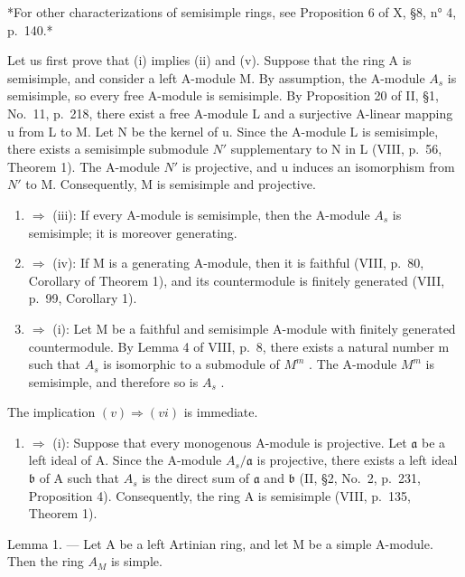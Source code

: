 *For other characterizations of semisimple rings, see Proposition 6 of X, §8, n° 4, p.~140.*

Let us first prove that (i) implies (ii) and (v). Suppose that the ring A is semisimple, and consider a left A-module M. By assumption, the A-module \(A_{s}\) is semisimple, so every free A-module is semisimple. By Proposition 20 of II, §1, No.~11, p.~218, there exist a free A-module L and a surjective A-linear mapping u from L to M. Let N be the kernel of u. Since the A-module L is semisimple, there exists a semisimple submodule \(N'\) supplementary to N in L (VIII, p.~56, Theorem 1). The A-module \(N'\) is projective, and u induces an isomorphism from \(N'\) to M. Consequently, M is semisimple and projective.

\begin{enumerate}
\def\labelenumi{(\roman{enumi})}
\setcounter{enumi}{1}
\item
  \(\Rightarrow\) (iii): If every A-module is semisimple, then the A-module \(A_{s}\) is semisimple; it is moreover generating.
\item
  \(\Rightarrow\) (iv): If M is a generating A-module, then it is faithful (VIII, p.~80, Corollary of Theorem 1), and its countermodule is finitely generated (VIII, p.~99, Corollary 1).
\item
  \(\Rightarrow\) (i): Let M be a faithful and semisimple A-module with finitely generated countermodule. By Lemma 4 of VIII, p.~8, there exists a natural number m such that \(A_{s}\) is isomorphic to a submodule of \(M^{m}\) . The A-module \(M^{m}\) is semisimple, and therefore so is \(A_{s}\) .
\end{enumerate}

The implication \((v) \Rightarrow (vi)\) is immediate.

\begin{enumerate}
\def\labelenumi{(\roman{enumi})}
\setcounter{enumi}{5}
\tightlist
\item
  \(\Rightarrow\) (i): Suppose that every monogenous A-module is projective. Let \(\mathfrak{a}\) be a left ideal of A. Since the A-module \(A_s / \mathfrak{a}\) is projective, there exists a left ideal \(\mathfrak{b}\) of A such that \(A_s\) is the direct sum of \(\mathfrak{a}\) and \(\mathfrak{b}\) (II, §2, No.~2, p.~231, Proposition 4). Consequently, the ring A is semisimple (VIII, p.~135, Theorem 1).
\end{enumerate}

Lemma 1. --- Let A be a left Artinian ring, and let M be a simple A-module. Then the ring \(A_{M}\) is simple.

